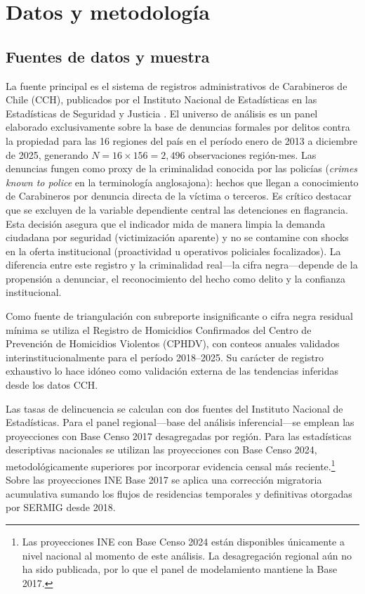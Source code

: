 \documentclass[12pt,a4paper]{article}
\begin{document}
\section{Datos y metodolog\'ia}
\label{sec:datos}

\subsection{Fuentes de datos y muestra}

La fuente principal es el sistema de registros administrativos de Carabineros de Chile
(CCH), publicados por el Instituto Nacional de Estad\'isticas en las Estad\'isticas de
Seguridad y Justicia \citep{INE2026}. El universo de an\'alisis es un panel elaborado
exclusivamente sobre la base de denuncias formales por delitos contra la propiedad
para las 16 regiones del pa\'is en el per\'iodo enero de 2013 a diciembre de 2025,
generando $N = 16 \times 156 = 2{,}496$ observaciones regi\'on-mes. Las denuncias fungen
como proxy de la criminalidad conocida por las polic\'ias (\textit{crimes known to
police} en la terminolog\'ia anglosajona): hechos que llegan a conocimiento de
Carabineros por denuncia directa de la v\'ictima o terceros. Es cr\'itico destacar que
se excluyen de la variable dependiente central las detenciones en flagrancia. Esta
decisi\'on asegura que el indicador mida de manera limpia la demanda ciudadana por
seguridad (victimizaci\'on aparente) y no se contamine con shocks en la oferta
institucional (proactividad u operativos policiales focalizados). La diferencia entre este
registro y la criminalidad real---la cifra negra---depende de la propensi\'on a denunciar,
el reconocimiento del hecho como delito y la confianza institucional.

Como fuente de triangulaci\'on con subreporte insignificante o cifra negra residual m\'inima
se utiliza el Registro de Homicidios Confirmados del Centro de Prevenci\'on de
Homicidios Violentos (CPHDV), con conteos anuales validados interinstitucionalmente para el per\'iodo
2018--2025. Su car\'acter de registro exhaustivo lo hace id\'oneo como validaci\'on
externa de las tendencias inferidas desde los datos CCH.

Las tasas de delincuencia se calculan con dos fuentes del Instituto Nacional de
Estad\'isticas. Para el panel regional---base del an\'alisis inferencial---se emplean
las proyecciones con Base Censo 2017 desagregadas por regi\'on. Para las estad\'isticas
descriptivas nacionales se utilizan las proyecciones con Base Censo 2024,
metodol\'ogicamente superiores por incorporar evidencia censal m\'as
reciente.\footnote{Las proyecciones INE con Base Censo 2024 est\'an disponibles
\'unicamente a nivel nacional al momento de este an\'alisis. La desagregaci\'on
regional a\'un no ha sido publicada, por lo que el panel de modelamiento mantiene la
Base 2017.} Sobre las proyecciones INE Base 2017 se aplica una correcci\'on migratoria
acumulativa sumando los flujos de residencias temporales y definitivas otorgadas por
SERMIG desde 2018.
\end{document}
